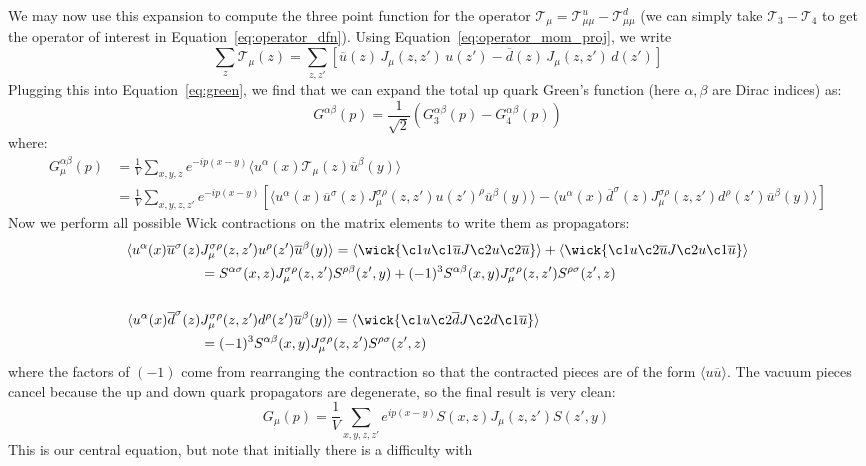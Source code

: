 \documentclass[11pt, oneside]{article}   	%
\theoremstyle{definition}
\begin{document}
We may now use this expansion to compute the three point function for the operator $\mathcal T_\mu = 
\mathcal T^u_{\mu\mu} - \mathcal T^d_{\mu\mu}$ (we can simply take $\mathcal T_3 - \mathcal T_4$ to get the operator of 
interest in Equation~\ref{eq:operator_dfn}). Using Equation~\ref{eq:operator_mom_proj}, we write 
\begin{equation}
	\sum_z \mathcal T_\mu(z) = \sum_{z, z'}\left[\overline u(z)\, J_\mu(z, z')\, u(z') - \overline d(z)\, J_\mu(z, z')\, d(z')\right]
\end{equation}
Plugging this into Equation~\ref{eq:green}, we find that we can expand the total up quark Green's function (here $\alpha, 
\beta$ are Dirac indices) as:
\begin{equation}
	G^{\alpha\beta}(p) = \frac{1}{\sqrt 2}\left(G_3^{\alpha\beta}(p) - G_4^{\alpha\beta} (p)\right)
\end{equation}
where:
\begin{align}
	G_\mu^{\alpha\beta}(p) &= \frac{1}{V}\sum_{x, y, z} e^{-ip(x - y)}\langle u^\alpha(x)\mathcal T_\mu(z) \overline u^\beta(y)
	\rangle \\
	&= \frac{1}{V}\sum_{x, y, z, z'} e^{-ip(x - y)}\left[\langle u^\alpha(x)\overline u^\sigma(z) J_\mu^{\sigma\rho}(z, z') 
	u(z')^\rho\overline u^\beta(y)\rangle - \langle u^\alpha(x)\overline d^\sigma(z) J_\mu^{\sigma\rho}(z, z') d^\rho(z') 
	\overline u^\beta(y)\rangle 
	\right]
\end{align}
Now we perform all possible Wick contractions on the matrix elements to write them as propagators:
\begin{align}
	\langle u^\alpha(x)\overline u^\sigma(z) &J_\mu^{\sigma\rho}(z, z') u^\rho(z')\overline u^\beta(y)\rangle = 
	\langle \wick{
		\c1 u \c1{\overline u} J \c2 u \c2{\overline u}
	} \rangle + \langle \wick{
		\c1 u \c2{\overline u} J \c2 u \c1{\overline u} 
	} \rangle \nonumber \\ 
	&= S^{\alpha\sigma}(x, z) J^{\sigma\rho}_\mu(z, z') S^{\rho\beta}(z', y) + (-1)^3 S^{\alpha\beta}(x, y) 
	J^{\sigma\rho}_\mu(z, z')S^{\rho\sigma}(z', z) \\
	\nonumber\\
	\langle u^\alpha(x)\overline d^\sigma(z) &J_\mu^{\sigma\rho}(z, z') d^\rho(z') \overline u^\beta(y)\rangle = 
	\langle \wick{
		\c1 u \c2{\overline d} J \c2 d \c1{\overline u}
	}\rangle\nonumber \\ 
	&= (-1)^3 S^{\alpha\beta}(x, y) J^{\sigma\rho}_\mu(z, z')S^{\rho\sigma}(z', z)
\end{align}
where the factors of $(-1)$ come from rearranging the contraction so that the contracted pieces are of the form 
$\langle u\overline u\rangle$. The vacuum pieces cancel because the up and down quark propagators are degenerate, so the 
final result is very clean:
\begin{equation}
	G_\mu(p) = \frac{1}{V}\sum_{x, y, z, z'}e^{ip(x - y)} S(x, z) J_\mu (z, z') S(z', y)~
	\label{eq:greens_function}
\end{equation}
This is our central equation, but note that initially there is a difficulty with 
\end{document}
